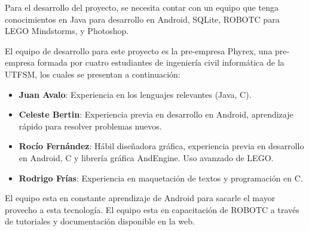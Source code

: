 Para el desarrollo del proyecto, se necesita contar con un equipo que tenga conocimientos en Java para desarrollo en Android, SQLite, ROBOTC para LEGO Mindstorms, y Photoshop. 

El equipo de desarrollo para este proyecto es la pre-empresa Phyrex, una pre-empresa formada por cuatro estudiantes de ingenier\'ia civil inform\'atica de la UTFSM, los cuales se presentan a continuaci\'on:

\begin{itemize}
\item {\bf Juan Avalo}: Experiencia en los lenguajes relevantes (Java, C). 
\item {\bf Celeste Bertin}: Experiencia previa en desarrollo en Android, aprendizaje r\'apido para resolver problemas nuevos. 
\item {\bf Roc\'io Fern\'andez}: H\'abil dise\~nadora gr\'afica, experiencia previa en desarrollo en Android, C y librer\'ia gr\'afica AndEngine. Uso avanzado de LEGO. 
\item {\bf Rodrigo Fr\'ias}: Experiencia en maquetaci\'on de textos y programaci\'on en C.
\end{itemize}

El equipo esta en constante aprendizaje de Android para sacarle el mayor provecho a esta tecnolog\'ia. El equipo esta en capacitaci\'on de ROBOTC a trav\'es de tutoriales y documentaci\'on disponible en la web. 
